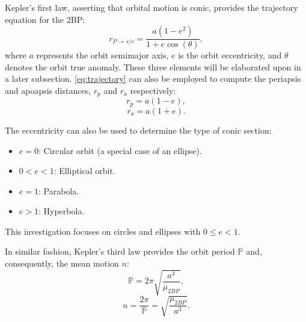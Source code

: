 Kepler's first law, asserting that orbital motion is conic, provides the trajectory equation for
the 2BP:
\begin{equation}
    r_{P\rightarrow s/c}=\frac{a(1-e^{2})}{1+e\cos(\theta)},
    \label{eq:trajectory}
\end{equation}
where $a$ represents the orbit semimajor axis, $e$ is the orbit eccentricity, and $\theta$ denotes
the orbit true anomaly. These three elements will be elaborated upon in a later subsection.
\cref{eq:trajectory} can also be employed to compute the periapsis and apoapsis distances, $r_{p}$
and $r_{a}$ respectively:
\begin{equation}
    r_{p}=a(1-e),
    \label{eq:periapsis}
\end{equation}
\begin{equation}
    r_{a}=a(1+e).
    \label{eq:apoapsis}
\end{equation}

The eccentricity can also be used to determine the type of conic section:
\begin{itemize}
    \item $e=0$: Circular orbit (a special case of an ellipse).
    \item $0<e<1$: Elliptical orbit.
    \item $e=1$: Parabola.
    \item $e>1$: Hyperbola.
\end{itemize}
This investigation focuses on circles and ellipses with $0\leq e<1$.

In similar fashion, Kepler's third law provides the orbit period $\mathbb{P}$ and, consequently,
the mean motion $n$:
\begin{equation}
    \mathbb{P}=2\pi\sqrt{\frac{a^{3}}{\mu_{2BP}}},
    \label{eq:period}
\end{equation}
\begin{equation}
    n=\frac{2\pi}{\mathbb{P}}=\sqrt{\frac{\mu_{2BP}}{a^{3}}}.
    \label{eq:meanmotion}
\end{equation}

